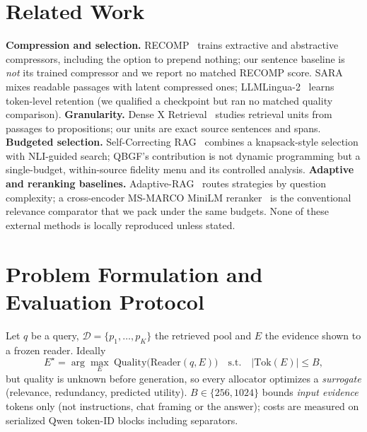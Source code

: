 \documentclass[10pt,twocolumn,letterpaper]{article}
\begin{document}
\section{Related Work}\label{sec:related}
\textbf{Compression and selection.} RECOMP~\cite{recomp2024} trains extractive and abstractive compressors, including the option to prepend nothing; our sentence baseline is \emph{not} its trained compressor and we report no matched RECOMP score. SARA~\cite{jin2026sara} mixes readable passages with latent compressed ones; LLMLingua-2~\cite{pan2024llmlingua2} learns token-level retention (we qualified a checkpoint but ran no matched quality comparison). \textbf{Granularity.} Dense X Retrieval~\cite{chen2024densex} studies retrieval units from passages to propositions; our units are exact source sentences and spans. \textbf{Budgeted selection.} Self-Correcting RAG~\cite{xu2026selfcorrecting} combines a knapsack-style selection with NLI-guided search; QBGF's contribution is not dynamic programming but a single-budget, within-source fidelity menu and its controlled analysis. \textbf{Adaptive and reranking baselines.} Adaptive-RAG~\cite{jeong2024adaptive} routes strategies by question complexity; a cross-encoder MS-MARCO MiniLM reranker~\cite{minilmreranker} is the conventional relevance comparator that we pack under the same budgets. None of these external methods is locally reproduced unless stated.

\section{Problem Formulation and Evaluation Protocol}\label{sec:problem}
Let $q$ be a query, $\mathcal D=\{p_1,\dots,p_K\}$ the retrieved pool and $E$ the evidence shown to a frozen reader. Ideally
\begin{equation}
E^\star=\arg\max_{E}\ \mathrm{Quality}\bigl(\mathrm{Reader}(q,E)\bigr)\quad\text{s.t.}\quad |\mathrm{Tok}(E)|\le B,\label{eq:ideal}
\end{equation}
but quality is unknown before generation, so every allocator optimizes a \emph{surrogate} (relevance, redundancy, predicted utility). $B\in\{256,1024\}$ bounds \emph{input evidence} tokens only (not instructions, chat framing or the answer); costs are measured on serialized Qwen token-ID blocks including separators.
\end{document}
